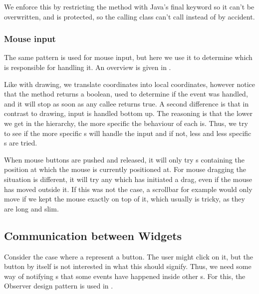 We enforce this by restricting the  method with Java's final
keyword so it can't be overwritten, and  is protected, so
the calling class can't call  instead of  by
accident.

\subsubsection{Mouse input}

The same pattern is used for mouse input, but here we use it to determine which
 is responsible for handling it. An overview is given in
.



Like with drawing, we translate coordinates into local coordinates,
however notice that the method returns a boolean, used to determine if
the event was handled, and it will stop as soon as any callee returns
true. A second difference is that in contrast to drawing, input is
handled bottom up. The reasoning is that the lower we get in the
hierarchy, the more specific the behaviour of each  is.
Thus, we try to see if the more specific s will handle
the input and if not, less and less specific s are
tried.

When mouse buttons are pushed and released, it will only try s
containing the position at which the mouse is currently positioned at. For
mouse dragging the situation is different, it will try any 
which has initiated a drag, even if the mouse has moved outside it. If this was
not the case, a scrollbar for example would only move if we kept the mouse
exactly on top of it, which usually is tricky, as they are long and slim.

\subsection{Communication between Widgets}
\label{sec:communication}

Consider the case where a  represent a button. The user might
click on it, but the button by itself is not interested in what this should
signify. Thus, we need some way of notifying s that some events
have happened inside other s. For this, the Observer design
pattern is used in .

